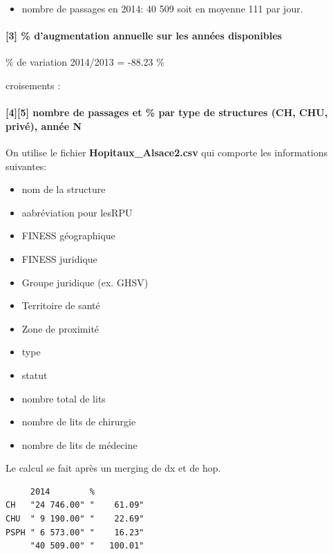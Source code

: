 \documentclass[]{article}
\begin{document}
\begin{itemize}
\itemsep1pt\parskip0pt
\item
  nombre de passages en 2014: 40 509 soit en moyenne 111 par jour.
\end{itemize}

\paragraph{{[}3{]} \% d'augmentation annuelle sur les années
disponibles}\label{daugmentation-annuelle-sur-les-annees-disponibles}

\% de variation 2014/2013 = -88.23 \%

croisements :

\paragraph{{[}4{]}{[}5{]} nombre de passages et \% par type de
structures (CH, CHU, privé), année
N}\label{nombre-de-passages-et-par-type-de-structures-ch-chu-prive-annee-n}

On utilise le fichier \textbf{Hopitaux\_Alsace2.csv} qui comporte les
informations suivantes:

\begin{itemize}
\itemsep1pt\parskip0pt
\item
  nom de la structure
\item
  aabréviation pour lesRPU
\item
  FINESS géographique
\item
  FINESS juridique
\item
  Groupe juridique (ex. GHSV)
\item
  Territoire de santé
\item
  Zone de proximité
\item
  type
\item
  statut
\item
  nombre total de lits
\item
  nombre de lits de chirurgie
\item
  nombre de lits de médecine
\end{itemize}

Le calcul se fait après un merging de dx et de hop.

\begin{verbatim}
     2014        %          
CH   "24 746.00" "    61.09"
CHU  " 9 190.00" "    22.69"
PSPH " 6 573.00" "    16.23"
     "40 509.00" "   100.01"
\end{verbatim}
\end{document}
